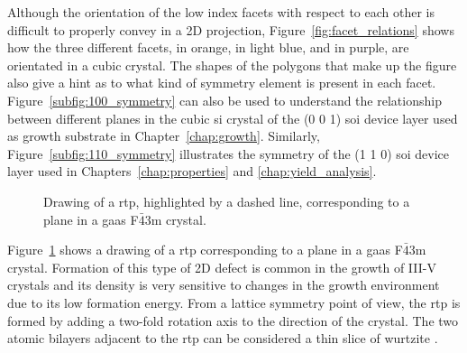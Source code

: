 Although the orientation of the low index facets with respect to each other is difficult to properly convey in a 2D projection, Figure~\ref{fig:facet_relations} shows how the three different facets,  in orange,  in light blue, and  in purple, are orientated in a cubic crystal. The shapes of the polygons that make up the figure also give a hint as to what kind of symmetry element is present in each facet. Figure~\ref{subfig:100_symmetry} can also be used to understand the relationship between different planes in the cubic \acl{si} crystal of the \hkl(0 0 1) \acf{soi} device layer used as growth substrate in Chapter~\ref{chap:growth}. Similarly, Figure~\ref{subfig:110_symmetry} illustrates the symmetry of the \hkl(1 1 0) \acs{soi} device layer used in Chapters~\ref{chap:properties} and \ref{chap:yield_analysis}.

\begin{figure}
    \centering
    \caption[Drawing of a  \acl{rtp} in a F\(\bar{4}\)3m crystal.]{Drawing of a \acf{rtp}, highlighted by a dashed line, corresponding to a  plane in a \acs{gaas} F\(\bar{4}\)3m crystal.}
    \label{fig:GaAs_rtp}
\end{figure}

Figure~\ref{fig:GaAs_rtp} shows a drawing of a \acf{rtp} corresponding to a  plane in a \acs{gaas} F\(\bar{4}\)3m crystal. Formation of this type of 2D defect is common in the growth of III-V crystals \cite{Borg2017} and its density is very sensitive to changes in the growth environment \cite{Algra2008, Chi2013} due to its low formation energy. From a lattice symmetry point of view, the \acs{rtp} is formed by adding a two-fold rotation axis to the  direction of the crystal. The two atomic bilayers adjacent to the \acs{rtp} can be considered a thin slice of wurtzite \cite{Glas2007, Vedel2022}.

